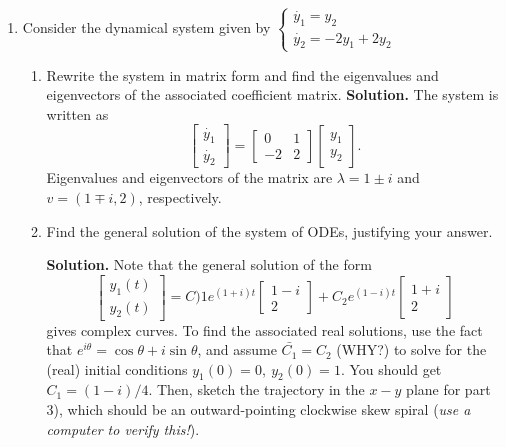 \documentclass[11pt,a4paper,twoside]{article}
\begin{document}
	\begin{enumerate}[\bfseries A.]
		\item Consider the dynamical system given by
		$
		\begin{cases}
			\dot{y_1} = y_2\\
			\dot{y_2} = -2y_1 + 2y_2
		\end{cases}
		$
		\begin{enumerate}[\bfseries 1)]
			\item Rewrite the system in matrix form and find the eigenvalues and eigenvectors of the associated coefficient matrix.
			\textbf{Solution.} The system is written as
			$$
			\begin{bmatrix}
				\dot{y_1}\\
				\dot{y_2}
			\end{bmatrix}=
			\begin{bmatrix}
				0 & 1\\
				-2 & 2
			\end{bmatrix}
			\begin{bmatrix}
				y_1\\
				y_2
			\end{bmatrix}.
			$$
			Eigenvalues and eigenvectors of the matrix are $\lambda = 1 \pm i$ and $v = (1 \mp i, 2)$, respectively.
			\item Find the general solution of the system of ODEs, justifying your answer.\par
			\textbf{Solution.} Note that the general solution of the form
			$$
			\begin{bmatrix}
				y_1(t)\\
				y_2(t)
			\end{bmatrix}
			= C)1e^{(1+i)t}
			\begin{bmatrix}
				1-i\\
				2
			\end{bmatrix}
			+ C_2e^{(1-i)t}
			\begin{bmatrix}
				1+i\\
				2
			\end{bmatrix}
			$$
			gives complex curves. To find the associated real solutions, use the fact that $e^{i\theta} = \cos \theta + i \sin \theta$, and assume $\bar{C_1} = C_2$ (WHY?) to solve for the (real) initial conditions $y_1(0) = 0,\ y_2(0) = 1$. You should get $C_1 = (1−i)/4$. Then, sketch the trajectory in the $x-y$ plane for part 3), which should be an outward-pointing clockwise skew spiral (\textit{use a computer to verify this!}).
		\end{enumerate}
	\end{enumerate}
\end{document}
